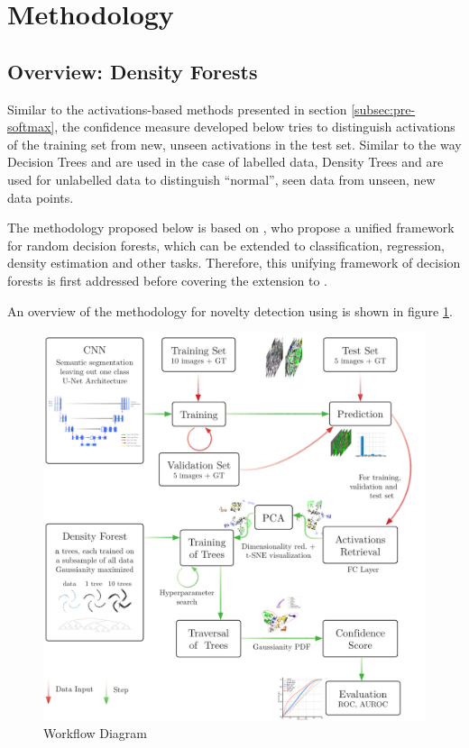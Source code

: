 \documentclass[10pt]{article}
\begin{document}
\section{Methodology}
\label{sec:methodology}

\subsection{Overview: Density Forests}
Similar to the activations-based methods presented in section \ref{subsec:pre-softmax}, the confidence measure developed below tries to distinguish activations of the training set from new, unseen activations in the test set. Similar to the way Decision Trees and  are used in the case of labelled data, Density Trees and  are used for unlabelled data to distinguish ``normal'', seen data from unseen, new data points.

The methodology proposed below is based on \textcite{decisionForests-MSR}, who propose a unified framework for random decision forests, which can be extended to classification, regression, density estimation and other tasks. Therefore, this unifying framework of decision forests is first addressed before covering the extension to . 

An overview of the methodology for novelty detection using  is shown in figure \ref{fig:schema}.

\begin{figure}[!ht]
    \centering
    \includegraphics[width=\textwidth]{Schema/schema_df}
    \caption{Workflow Diagram}
    \label{fig:schema}
\end{figure}
\end{document}
